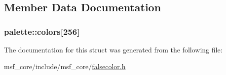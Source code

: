 \subsection{Member Data Documentation}
\hypertarget{structpalette_aa1a2941bd65472f07de5e54bcf36678b}{
\subsubsection[{colors}]{ palette\-::colors\mbox{[}256\mbox{]}}}\label{structpalette_aa1a2941bd65472f07de5e54bcf36678b}


The documentation for this struct was generated from the following file\-:\begin{DoxyCompactItemize}
\item 
msf\-\_\-core/include/msf\-\_\-core/\hyperlink{falsecolor_8h}{falsecolor.\-h}\end{DoxyCompactItemize}
